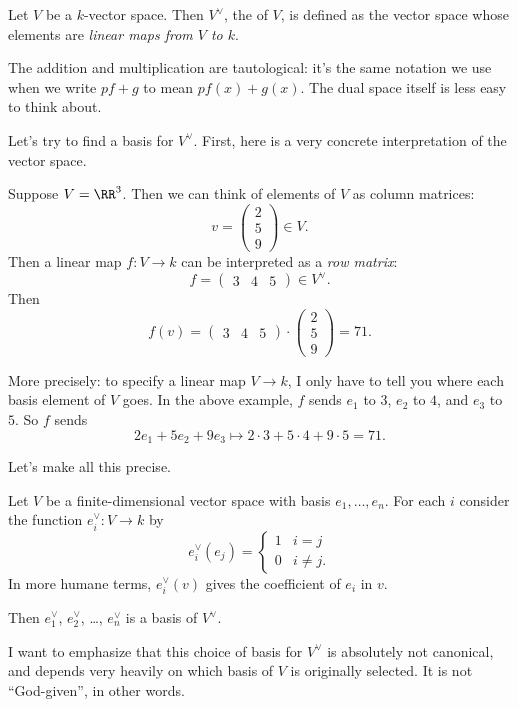 \begin{definition}
	Let $V$ be a $k$-vector space.
	Then $V^\vee$, the  of $V$, is defined
	as the vector space whose elements are \emph{linear maps from $V$ to $k$}.
\end{definition}
The addition and multiplication are tautological:
it's the same notation we use when we write $pf+g$ to mean $pf(x) + g(x)$.
The dual space itself is less easy to think about.

Let's try to find a basis for $V^\vee$.
First, here is a very concrete interpretation of the vector space.
\begin{example}
	Suppose $V = \RR^3$.
	Then we can think of elements of $V$ as column matrices:
	\[ v = \left(
		\begin{array}{c}
			2 \\ 5 \\ 9
		\end{array}
		\right) \in V. \]
	Then a linear map $f : V \to k$ can be interpreted as a \emph{row matrix}:
	\[
		f = \left(
		\begin{array}{ccc}
			3 & 4 & 5
		\end{array}
		\right) \in V^\vee. \]
	Then
	\[
		f(v)
		= \left(
		\begin{array}{ccc}
			3 & 4 & 5
		\end{array}
		\right)
		\cdot
		\left(
		\begin{array}{c}
			2 \\ 5 \\ 9
		\end{array}
		\right)
		= 71. \]
\end{example}
More precisely: to specify a linear map $V \to k$,
I only have to tell you where each basis element of $V$ goes.
In the above example, $f$ sends $e_1$ to $3$, $e_2$ to $4$, and $e_3$ to $5$.
So $f$ sends \[ 2e_1 + 5e_2 + 9e_3 \mapsto 2 \cdot 3 + 5 \cdot 4 + 9 \cdot 5 = 71. \]

Let's make all this precise.
\begin{proposition}
	Let $V$ be a finite-dimensional vector space with basis $e_1, \dots, e_n$.
	For each $i$ consider the function $e_i^\vee : V \to k$ by
	\[
		e_i^\vee(e_j)
		= \begin{cases}
			1 & i=j \\
			0 & i \neq j.
		\end{cases}
	\]
	In more humane terms, $e_i^\vee(v)$ gives the coefficient of $e_i$ in $v$.

	Then $e_1^\vee$, $e_2^\vee$, \dots, $e_n^\vee$ is a basis of $V^\vee$.
\end{proposition}
I want to emphasize that this choice of basis for $V^\vee$ is absolutely not canonical, and depends very heavily on which basis of $V$ is originally selected.
It is not ``God-given'', in other words.

